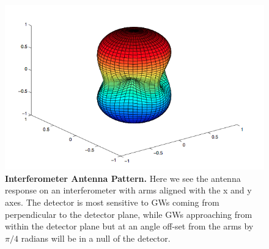 \documentclass[11pt]{cuthesis}
\newcommand{\fs}{\text{ .}}
\begin{document}


\begin{figure} %
\begin{center}
\includegraphics[width=0.8\linewidth]{antenna_pattern.png}
\end{center}
\caption{\textbf{Interferometer Antenna Pattern.} Here we see the antenna response on an interferometer with arms aligned with the x and y axes. The detector is most sensitive to GWs coming from perpendicular to the detector plane, while GWs approaching from within the detector plane but at an angle off-set from the arms by $\pi/4$ radians will be in a null of the detector. \cite{lrr-2009-2} }
\label{fig:antenna pattern}
\end{figure}
\end{document}
